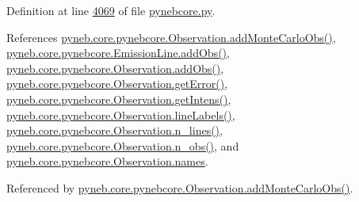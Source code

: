 Definition at line \hyperlink{pynebcore_8py_source_l04069}{4069} of file \hyperlink{pynebcore_8py_source}{pynebcore.\-py}.



References \hyperlink{pynebcore_8py_source_l04069}{pyneb.\-core.\-pynebcore.\-Observation.\-add\-Monte\-Carlo\-Obs()}, \hyperlink{pynebcore_8py_source_l03469}{pyneb.\-core.\-pynebcore.\-Emission\-Line.\-add\-Obs()}, \hyperlink{pynebcore_8py_source_l03589}{pyneb.\-core.\-pynebcore.\-Observation.\-add\-Obs()}, \hyperlink{pynebcore_8py_source_l03931}{pyneb.\-core.\-pynebcore.\-Observation.\-get\-Error()}, \hyperlink{pynebcore_8py_source_l03904}{pyneb.\-core.\-pynebcore.\-Observation.\-get\-Intens()}, \hyperlink{pynebcore_8py_source_l03615}{pyneb.\-core.\-pynebcore.\-Observation.\-line\-Labels()}, \hyperlink{pynebcore_8py_source_l03624}{pyneb.\-core.\-pynebcore.\-Observation.\-n\-\_\-lines()}, \hyperlink{pynebcore_8py_source_l03642}{pyneb.\-core.\-pynebcore.\-Observation.\-n\-\_\-obs()}, and \hyperlink{pynebcore_8py_source_l03543}{pyneb.\-core.\-pynebcore.\-Observation.\-names}.



Referenced by \hyperlink{pynebcore_8py_source_l04069}{pyneb.\-core.\-pynebcore.\-Observation.\-add\-Monte\-Carlo\-Obs()}.


